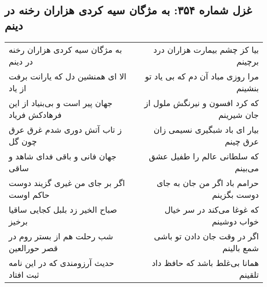 \begin{center}
\section*{غزل شماره ۳۵۴: به مژگان سیه کردی هزاران رخنه در دینم}
\label{sec:sh354}
\begin{longtable}{l p{0.5cm} r}
به مژگان سیه کردی هزاران رخنه در دینم
&&
بیا کز چشم بیمارت هزاران درد برچینم
\\
الا ای همنشین دل که یارانت برفت از یاد
&&
مرا روزی مباد آن دم که بی یاد تو بنشینم
\\
جهان پیر است و بی‌بنیاد از این فرهادکش فریاد
&&
که کرد افسون و نیرنگش ملول از جان شیرینم
\\
ز تاب آتش دوری شدم غرق عرق چون گل
&&
بیار ای باد شبگیری نسیمی زان عرق چینم
\\
جهان فانی و باقی فدای شاهد و ساقی
&&
که سلطانی عالم را طفیل عشق می‌بینم
\\
اگر بر جای من غیری گزیند دوست حاکم اوست
&&
حرامم باد اگر من جان به جای دوست بگزینم
\\
صباح الخیر زد بلبل کجایی ساقیا برخیز
&&
که غوغا می‌کند در سر خیال خواب دوشینم
\\
شب رحلت هم از بستر روم در قصر حورالعین
&&
اگر در وقت جان دادن تو باشی شمع بالینم
\\
حدیث آرزومندی که در این نامه ثبت افتاد
&&
همانا بی‌غلط باشد که حافظ داد تلقینم
\\
\end{longtable}
\end{center}
